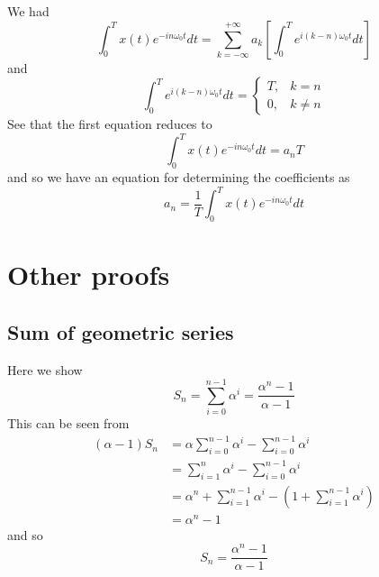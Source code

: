 \documentclass{report}
\begin{document}
We had
\begin{equation*}
\int^T_0x(t)e^{-in\omega_0t}dt=\sum^{+\infty}_{k=-\infty}a_k\left[\int^T_0e^{i(k-n)\omega_0t}dt\right]
\end{equation*}
and 
\begin{equation*}
\int^T_0e^{i(k-n)\omega_0t}dt=\begin{cases}
T,&k=n\\
0,&k\neq n\end{cases}
\end{equation*}
See that the first equation reduces to
\begin{equation*}
\int^T_0x(t)e^{-in\omega_0t}dt=a_nT
\end{equation*}
and so we have an equation for determining the coefficients as
\begin{equation*}
a_n=\frac{1}{T}\int^T_0x(t)e^{-in\omega_0t}dt
\end{equation*}







\appendix
\chapter{Other proofs}
\section{Sum of geometric series}
Here we show
\begin{equation*}
S_n=\sum^{n-1}_{i=0}\alpha^i=\frac{\alpha^n-1}{\alpha-1}
\end{equation*}
This can be seen from
\begin{align*}
(\alpha-1)S_n&=\alpha\sum^{n-1}_{i=0}\alpha^i-\sum^{n-1}_{i=0}\alpha^i\\
&=\sum^{n}_{i=1}\alpha^i-\sum^{n-1}_{i=0}\alpha^i\\
&=\alpha^n+\sum^{n-1}_{i=1}\alpha^i-(1+\sum^{n-1}_{i=1}\alpha^i)\\
&=\alpha^n-1
\end{align*}
and so
\begin{equation*}
S_n=\frac{\alpha^n-1}{\alpha-1}
\end{equation*}
\end{document}
